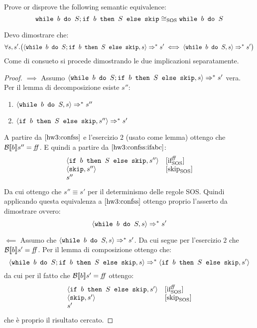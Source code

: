 {
  Prove or disprove the following semantic equivalence:
  $$
  \wbS{b}{S}; \ifABC{b}{S}{\skipForFriends} \eqSOS \wbS{b}{S}
  $$
}
{
  Devo dimostrare che:
  $$
  \forall s, s'. \big( \confSs{\wbS{b}{S}; \ifABC{b}{S}{\skipForFriends}}{s}
  \Rar{*} s' \iff \confSs{\wbS{b}{S}}{s} \Rar{*} s'\big)
  $$
  Come di consueto si procede dimostrando le due implicazioni separatamente.
  \begin{proof}
    $\boxed{\implies}$
    Assumo $\confSs{\wbS{b}{S}; \ifABC{b}{S}{\skipForFriends}}{s} \Rar{*}
    s'$ vera. \\
    Per il lemma di decomposizione esiste $s''$:
    \begin{enumerate}
    \item $\confSs{\wbS{b}{S}}{s} \Rar{*} s''$
      \label{hw3:confss}
    \item $\confSs{\ifABC{b}{S}{\skipForFriends}}{s''} \Rar{*} s'$
      \label{hw3:confss:ifabc}
    \end{enumerate}
    A partire da $\ref{hw3:confss}$ e l'esercizio $2$ (usato come lemma) 
   ottengo che $\B{b}'' =
    \semfalse$. E quindi a partire da $\ref{hw3:confss:ifabc}$:
    $$
    \begin{array}{ll}
      \confSs{\ifABC{b}{S}{\skipForFriends}}{s''} & \ifffSOS \\
      \confSs{\skipForFriends}{s''} & \skipSOS \\
      s''
    \end{array}
    $$
    Da cui ottengo che $\boxed{s'' \equiv s'}$ per il determinismo delle regole SOS.
    Quindi applicando questa equivalenza a $\ref{hw3:confss}$ ottengo proprio
    l'asserto da dimostrare ovvero:
    $$
    \confSs{\wbS{b}{S}}{s} \Rar{*} s'
    $$
    
    $\boxed{\impliedby}$
    Assumo che $\confSs{\wbS{b}{S}}{s} \Rar{*} s'$. Da cui segue per
    l'esercizio $2$ che $\B{b}' = \semfalse$.
    Per il lemma di composizione ottengo che:
    $$
    \confSs{\wbS{b}{S}; \ifABC{b}{S}{\skipForFriends}}{s} \Rar{*} \confSs{\ifABC{b}{S}{\skipForFriends}}{s'}
    $$
    da cui per il fatto che $\B{b}' = \semfalse$ ottengo:
    $$
    \begin{array}{ll}
      \confSs{\ifABC{b}{S}{\skipForFriends}}{s'} & \ifffSOS \\
      \confSs{\skipForFriends}{s'} & \skipSOS \\
      s' & \\
    \end{array}
    $$
    che è proprio il risultato cercato.
  
    
  

  \end{proof}
  
}
